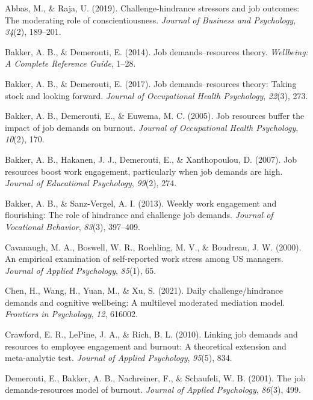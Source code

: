 \documentclass[
  man]{apa7}
\newlength{\cslhangindent}
\newenvironment{CSLReferences}[2] %
 {\begin{list}{}{%
  \setlength{\itemindent}{0pt}
  \setlength{\leftmargin}{0pt}
  \setlength{\parsep}{0pt}
  \ifodd #1
   \setlength{\leftmargin}{\cslhangindent}
   \setlength{\itemindent}{-1\cslhangindent}
  \fi
  \setlength{\itemsep}{#2\baselineskip}}}
 {\end{list}}
\begin{document}
\label{refs}
\begin{CSLReferences}{1}{0}
Abbas, M., \& Raja, U. (2019). Challenge-hindrance stressors and job outcomes: The moderating role of conscientiousness. \emph{Journal of Business and Psychology}, \emph{34}(2), 189--201.

Bakker, A. B., \& Demerouti, E. (2014). Job demands--resources theory. \emph{Wellbeing: A Complete Reference Guide}, 1--28.

Bakker, A. B., \& Demerouti, E. (2017). Job demands--resources theory: Taking stock and looking forward. \emph{Journal of Occupational Health Psychology}, \emph{22}(3), 273.

Bakker, A. B., Demerouti, E., \& Euwema, M. C. (2005). Job resources buffer the impact of job demands on burnout. \emph{Journal of Occupational Health Psychology}, \emph{10}(2), 170.

Bakker, A. B., Hakanen, J. J., Demerouti, E., \& Xanthopoulou, D. (2007). Job resources boost work engagement, particularly when job demands are high. \emph{Journal of Educational Psychology}, \emph{99}(2), 274.

Bakker, A. B., \& Sanz-Vergel, A. I. (2013). Weekly work engagement and flourishing: The role of hindrance and challenge job demands. \emph{Journal of Vocational Behavior}, \emph{83}(3), 397--409.

Cavanaugh, M. A., Boswell, W. R., Roehling, M. V., \& Boudreau, J. W. (2000). An empirical examination of self-reported work stress among US managers. \emph{Journal of Applied Psychology}, \emph{85}(1), 65.

Chen, H., Wang, H., Yuan, M., \& Xu, S. (2021). Daily challenge/hindrance demands and cognitive wellbeing: A multilevel moderated mediation model. \emph{Frontiers in Psychology}, \emph{12}, 616002.

Crawford, E. R., LePine, J. A., \& Rich, B. L. (2010). Linking job demands and resources to employee engagement and burnout: A theoretical extension and meta-analytic test. \emph{Journal of Applied Psychology}, \emph{95}(5), 834.

Demerouti, E., Bakker, A. B., Nachreiner, F., \& Schaufeli, W. B. (2001). The job demands-resources model of burnout. \emph{Journal of Applied Psychology}, \emph{86}(3), 499.


\end{CSLReferences}
\end{document}
